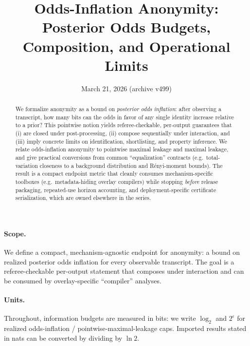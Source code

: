 \documentclass[11pt]{article}
\title{Odds-Inflation Anonymity:\\ Posterior Odds Budgets, Composition, and Operational Limits}
\author{}
\date{March 21, 2026 (archive v499)}
\theoremstyle{definition}
\theoremstyle{remark}
\begin{document}
\maketitle

\begin{abstract}
We formalize anonymity as a bound on \emph{posterior odds inflation}: after observing a transcript, how many bits can the odds in favor of any single identity increase relative to a prior?
This pointwise notion yields referee-checkable, per-output guarantees that (i) are closed under post-processing, (ii) compose sequentially under interaction, and (iii) imply concrete limits on identification, shortlisting, and property inference.
We relate odds-inflation anonymity to pointwise maximal leakage and maximal leakage, and give practical conversions from common ``equalization'' contracts (e.g.\ total-variation closeness to a background distribution and R\'enyi-moment bounds).
The result is a compact endpoint metric that cleanly consumes mechanism-specific toolboxes (e.g.\ metadata-hiding overlay compilers) while stopping \emph{before} release packaging, repeated-use horizon accounting, and deployment-specific certificate serialization, which are owned elsewhere in the series.
\end{abstract}
\paragraph{Scope.}
We define a compact, mechanism-agnostic endpoint for anonymity: a bound on realized posterior odds inflation for every observable transcript.
The goal is a referee-checkable per-output statement that composes under interaction and can be consumed by overlay-specific ``compiler'' analyses.

\paragraph{Units.} Throughout, information budgets are measured in bits: we write $\log_2$ and $2^{\epsilon}$ for realized odds-inflation / pointwise-maximal-leakage caps. Imported results stated in nats can be converted by dividing by $\ln 2$.
\end{document}
